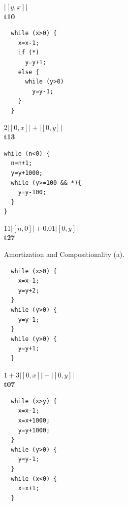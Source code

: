 \documentclass[nocopyrightspace,preprint,pldi]{sigplanconf-pldi15}
\begin{document}
{\begin{figure}
\begin{minipage}[b]{\progwidth}
\begin{center}
$|[y,x]|$
\\[.7\baselineskip]
      {\bf t10}
    \end{center}
  \end{minipage}
%
%
%
  \begin{minipage}[b]{\progwidth}
    \begin{center}
   \begin{lstlisting}
  while (x>0) {
    x=x-1;
    if (*)
      y=y+1;
    else {
      while (y>0)
        y=y-1;
    }
  }
   \end{lstlisting}

$2|[0,x]| + |[0,y]|$
\\[.7\baselineskip]
      {\bf t13}
    \end{center}
  \end{minipage}
%
%
%
  \begin{minipage}[b]{\progwidth}
    \begin{center}
   \begin{lstlisting}
while (n<0) {
  n=n+1;
  y=y+1000;
  while (y>=100 && *){
    y=y-100;
  }
}
   \end{lstlisting}

$11|[n,0]| + 0.01|[0,y]|$
\\[.7\baselineskip]
      {\bf t27}
    \end{center}
  \end{minipage}
   \caption{Amortization and Compositionality (a).}
  \label{fig:cat1a}
\end{figure}


\begin{figure}
 \setlength{\progwidth}{.18\linewidth}
  \centering

  \begin{minipage}[b]{\progwidth}
    \begin{center}
   \begin{lstlisting}
  while (x>0) {
    x=x-1;
    y=y+2;
  }
  while (y>0) {
    y=y-1;
  }
  while (y>0) {
    y=y+1;
  }
   \end{lstlisting}

$1 + 3|[0,x]| + |[0,y]|$
\\[.7\baselineskip]
      {\bf t07}
    \end{center}
  \end{minipage}%
%
%
%
  \begin{minipage}[b]{\progwidth}
    \begin{center}
   \begin{lstlisting}
  while (x>y) {
    x=x-1;
    x=x+1000;
    y=y+1000;
  }
  while (y>0) {
    y=y-1;
  }
  while (x<0) {
    x=x+1;
  }
   \end{lstlisting}


\end{center}
\end{minipage}
\end{figure}}
\end{document}
